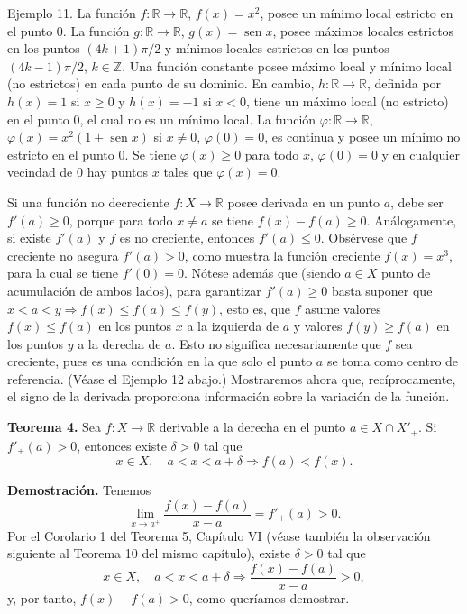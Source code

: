 \documentclass[12pt,oneside]{book}
\begin{document}
Ejemplo 11. La función \( f: \mathbb{R} \to \mathbb{R} \), \( f(x) = x^2 \), posee un mínimo local estricto en el punto \( 0 \). La función \( g: \mathbb{R} \to \mathbb{R} \), \( g(x) = \operatorname{sen} x \), posee máximos locales estrictos en los puntos \( (4k+1)\pi/2 \) y mínimos locales estrictos en los puntos \( (4k-1)\pi/2 \), \( k \in \mathbb{Z} \). Una función constante posee máximo local y mínimo local (no estrictos) en cada punto de su dominio. En cambio, \( h: \mathbb{R} \to \mathbb{R} \), definida por \( h(x) = 1 \) si \( x \geq 0 \) y \( h(x) = -1 \) si \( x < 0 \), tiene un máximo local (no estricto) en el punto \( 0 \), el cual no es un mínimo local. La función \( \varphi: \mathbb{R} \to \mathbb{R} \), \( \varphi(x) = x^2(1 + \operatorname{sen} x) \) si \( x \neq 0 \), \( \varphi(0) = 0 \), es continua y posee un mínimo no estricto en el punto \( 0 \). Se tiene \( \varphi(x) \geq 0 \) para todo \( x \), \( \varphi(0) = 0 \) y en cualquier vecindad de \( 0 \) hay puntos \( x \) tales que \( \varphi(x) = 0 \).

Si una función no decreciente \( f: X \to \mathbb{R} \) posee derivada en un punto \( a \), debe ser \( f'(a) \geq 0 \), porque para todo \( x \neq a \) se tiene \( f(x) - f(a) \geq 0 \). Análogamente, si existe \( f'(a) \) y \( f \) es no creciente, entonces \( f'(a) \leq 0 \). Obsérvese que \( f \) creciente no asegura \( f'(a) > 0 \), como muestra la función creciente \( f(x) = x^3 \), para la cual se tiene \( f'(0) = 0 \). Nótese además que (siendo \( a \in X \) punto de acumulación de ambos lados), para garantizar \( f'(a) \geq 0 \) basta suponer que \( x < a < y \Rightarrow f(x) \leq f(a) \leq f(y) \), esto es, que \( f \) asume valores \( f(x) \leq f(a) \) en los puntos \( x \) a la izquierda de \( a \) y valores \( f(y) \geq f(a) \) en los puntos \( y \) a la derecha de \( a \). Esto no significa necesariamente que \( f \) sea creciente, pues es una condición en la que solo el punto \( a \) se toma como centro de referencia. (Véase el Ejemplo 12 abajo.) Mostraremos ahora que, recíprocamente, el signo de la derivada proporciona información sobre la variación de la función.

\textbf{Teorema 4.} Sea \( f: X \to \mathbb{R} \) derivable a la derecha en el punto \( a \in X \cap X'_+ \). Si \( f'_+(a) > 0 \), entonces existe \( \delta > 0 \) tal que
\[
x \in X, \quad a < x < a + \delta \Rightarrow f(a) < f(x).
\]

\textbf{Demostración.} Tenemos
\[
\lim_{x \to a^+} \frac{f(x) - f(a)}{x - a} = f'_+(a) > 0.
\]
Por el Corolario 1 del Teorema 5, Capítulo VI (véase también la observación siguiente al Teorema 10 del mismo capítulo), existe \( \delta > 0 \) tal que
\[
x \in X, \quad a < x < a + \delta \Rightarrow \frac{f(x) - f(a)}{x - a} > 0,
\]
y, por tanto, \( f(x) - f(a) > 0 \), como queríamos demostrar.
\end{document}
